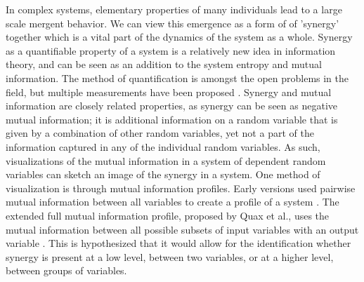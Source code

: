 \documentclass[../main.tex]{subfiles}
\begin{document}
In complex systems, elementary properties of many individuals lead to a large scale mergent behavior.
We can view this emergence as a form of of ’synergy’ together which is a vital part of the dynamics of the system as a whole. 
Synergy as a quantifiable property of a system is a relatively new idea in information theory, and can be seen as an addition to the system entropy and mutual information.
The method of quantification is amongst the open problems in the field, but multiple measurements have been proposed \cite{}.
Synergy and mutual information are closely related properties, as synergy can be seen as negative mutual information; it is additional information on a random variable that is given by a combination of other random variables, yet not a part of the information captured in any of the individual random variables.
As such, visualizations of the mutual information in a system of dependent random variables can sketch an image of the synergy in a system.
One method of visualization is through mutual information profiles.
Early versions used pairwise mutual information between all variables to create a profile of a system \cite{bar2013computationally}. 
The extended full mutual information profile, proposed by Quax et al., uses the mutual information between all possible subsets of input variables with an output variable \cite{quax2017quantifying}.
This is hypothesized that it would allow for the identification whether synergy is present at a low level, between two variables, or at a higher level, between groups of variables.
\end{document}
